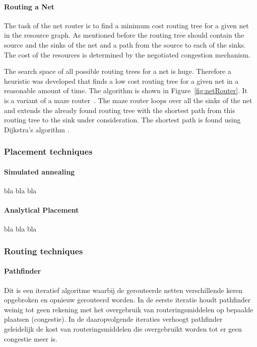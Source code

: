 \documentclass[a4paper,oneside,12pt]{article}
\begin{document}
\paragraph{Routing a Net}
\label{sec:netRouter}
The task of the net router is to find a minimum cost routing tree for a given net in the resource graph. As mentioned before the routing tree should contain the source and the sinks of the net and a path from the source to each of the sinks. The cost of the resources is determined by the negotiated congestion mechanism.

The search space of all possible routing trees for a net is huge. Therefore a heuristic was developed that finds a low cost routing tree for a given net in a reasonable amount of time. The algorithm is shown in Figure~\ref{fig:netRouter}. It is a variant of a maze router~\cite{lee1961aafpcaia}. The maze router loops over all the sinks of the net and extends the already found routing tree with the shortest path from this routing tree to the sink under consideration. The shortest path is found using Dijk\-stra's algorithm \cite{dijkstra1959anotpicwg}.



\subsubsection{Placement techniques}\label{placementtech}

\paragraph{Simulated annealing}
bla bla bla

\paragraph{Analytical Placement}
bla bla bla

\subsubsection{Routing techniques}\label{routingtech}

\paragraph{Pathfinder}
Dit is een iteratief algoritme waarbij de gerouteerde netten verschillende keren opgebroken en opnieuw gerouteerd worden. In de eerste iteratie houdt pathfinder weinig tot geen rekening met het overgebruik van routeringsmiddelen op bepaalde plaatsen (congestie). In de daaropvolgende iteraties verhoogt pathfinder geleidelijk de kost van routeringsmiddelen die overgebruikt worden tot er geen congestie meer is.
\end{document}
